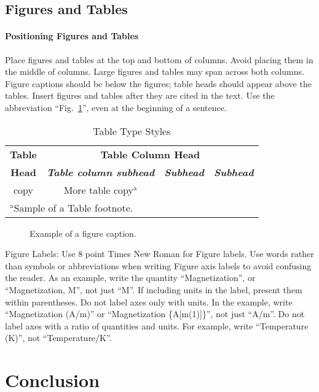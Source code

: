 \documentclass[conference]{IEEEtran}
\begin{document}
\subsection{Figures and Tables}
\paragraph{Positioning Figures and Tables} Place figures and tables at the top and 
bottom of columns. Avoid placing them in the middle of columns. Large 
figures and tables may span across both columns. Figure captions should be 
below the figures; table heads should appear above the tables. Insert 
figures and tables after they are cited in the text. Use the abbreviation 
``Fig.~\ref{fig}'', even at the beginning of a sentence.

\begin{table}[htbp]
\caption{Table Type Styles}
\begin{center}
\begin{tabular}{|c|c|c|c|}
\hline
\textbf{Table}&\multicolumn{3}{|c|}{\textbf{Table Column Head}} \\
\cline{2-4} 
\textbf{Head} & \textbf{\textit{Table column subhead}}& \textbf{\textit{Subhead}}& \textbf{\textit{Subhead}} \\
\hline
copy& More table copy$^{\mathrm{a}}$& &  \\
\hline
\multicolumn{4}{l}{$^{\mathrm{a}}$Sample of a Table footnote.}
\end{tabular}
\label{tab1}
\end{center}
\end{table}

\begin{figure}[htbp]
\caption{Example of a figure caption.}
\label{fig}
\end{figure}

Figure Labels: Use 8 point Times New Roman for Figure labels. Use words 
rather than symbols or abbreviations when writing Figure axis labels to 
avoid confusing the reader. As an example, write the quantity 
``Magnetization'', or ``Magnetization, M'', not just ``M''. If including 
units in the label, present them within parentheses. Do not label axes only 
with units. In the example, write ``Magnetization (A/m)'' or ``Magnetization 
\{A[m(1)]\}'', not just ``A/m''. Do not label axes with a ratio of 
quantities and units. For example, write ``Temperature (K)'', not 
``Temperature/K''.

\section{Conclusion}
\end{document}
